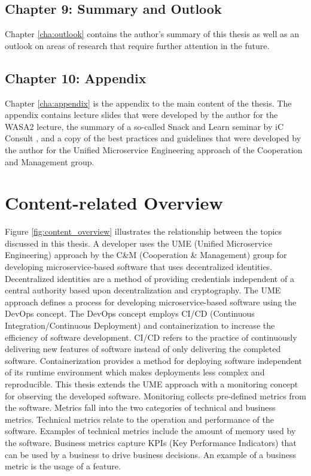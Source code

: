 \subsection*{Chapter 9: Summary and Outlook}

Chapter \ref{cha:outlook} contains the author's summary of this thesis
as well as an outlook on areas of research that require further attention in the future.

\subsection*{Chapter 10: Appendix}

Chapter \ref{cha:appendix} is the appendix to the main content of the thesis.
The appendix contains lecture slides that were developed by the author for the WASA2 lecture,
the summary of a so-called Snack and Learn seminar by iC Consult \cite{ICC-WEB},
and a copy of the best practices and guidelines that were developed by the author
for the Unified Microservice Engineering approach of the Cooperation and Management group.

\section{Content-related Overview}
\label{sec:content_overview}


Figure \ref{fig:content_overview} illustrates the relationship between the topics
discussed in this thesis. A developer uses the UME (Unified Microservice Engineering) approach
by the C\&M (Cooperation \& Management) group for developing microservice-based software
that uses decentralized identities. Decentralized identities are a method of providing
credentials independent of a central authority based upon decentralization and cryptography.
The UME approach defines a process for developing microservice-based software
using the DevOps concept. The DevOps concept employs CI/CD (Continuous Integration/Continuous Deployment)
and containerization to increase the efficiency of software development.
CI/CD refers to the practice of continuously delivering new features of software instead
of only delivering the completed software. Containerization provides a method for
deploying software independent of its runtime environment which makes deployments
less complex and reproducible. This thesis extends the UME approach
with a monitoring concept for observing the developed software.
Monitoring collects pre-defined metrics from the software.
Metrics fall into the two categories of technical and business metrics.
Technical metrics relate to the operation and performance of the software.
Examples of technical metrics include the amount of memory used by the software.
Business metrics capture KPIs (Key Performance Indicators) that can be used
by a business to drive business decisions. An example of a business metric
is the usage of a feature.

